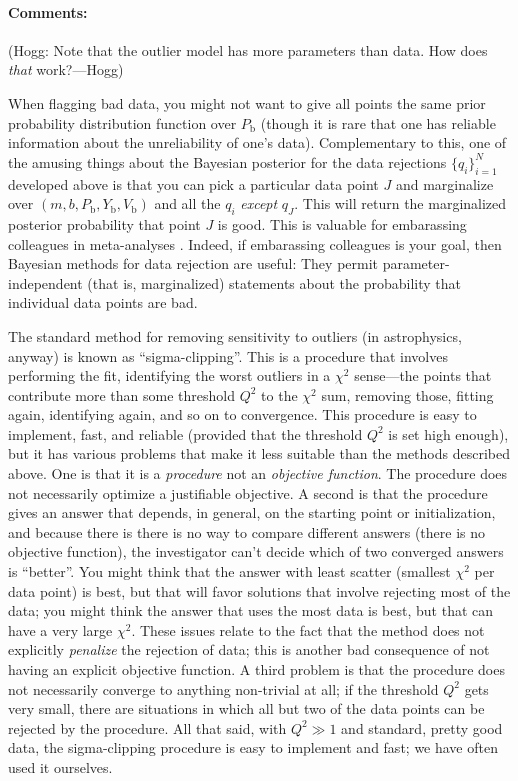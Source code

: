 \documentclass[12pt,twoside]{article}
\newcommand{\commentsname}{Comments}
\newcounter{problem}
\newenvironment{comments}{\paragraph{\commentsname:}}{}
\newcommand{\setofall}[3]{\{{#1}\}_{{#2}}^{{#3}}}
\newcommand{\allq}{\setofall{q_i}{i=1}{N}}
\newcommand{\Pbad}{P_{\mathrm{b}}}
\newcommand{\Ybad}{Y_{\mathrm{b}}}
\newcommand{\Vbad}{V_{\mathrm{b}}}
\begin{document}
\begin{comments}
(Hogg: Note that the outlier model has more parameters than data.  How
  does \emph{that} work?---Hogg)

When flagging bad data, you might not want to give all points the same
prior probability distribution function over $\Pbad$ (though it is
rare that one has reliable information about the unreliability of
one's data).  Complementary to this, one of the amusing things about
the Bayesian posterior for the data rejections $\allq$ developed above
is that you can pick a particular data point $J$ and marginalize over
$(m,b,\Pbad,\Ybad,\Vbad)$ and all the $q_i$ \emph{except} $q_J$.  This
will return the marginalized posterior probability that point $J$ is
good.  This is valuable for embarassing colleagues in meta-analyses
\citep{pressH0}.  Indeed, if embarassing colleagues is your goal, then
Bayesian methods for data rejection are useful:  They permit
parameter-independent (that is, marginalized) statements about the
probability that individual data points are bad.

The standard method for removing sensitivity to outliers (in
astrophysics, anyway) is known as ``sigma-clipping''.  This is a
procedure that involves performing the fit, identifying the worst
outliers in a $\chi^2$ sense---the points that contribute more than
some threshold $Q^2$ to the $\chi^2$ sum, removing those, fitting
again, identifying again, and so on to convergence.  This procedure is
easy to implement, fast, and reliable (provided that the threshold
$Q^2$ is set high enough), but it has various problems that make it
less suitable than the methods described above.  One is that it is a
\emph{procedure} not an \emph{objective function}.  The procedure does
not necessarily optimize a justifiable objective.  A second is that
the procedure gives an answer that depends, in general, on the
starting point or initialization, and because there is there is no way
to compare different answers (there is no objective function), the
investigator can't decide which of two converged answers is
``better''.  You might think that the answer with least scatter
(smallest $\chi^2$ per data point) is best, but that will favor
solutions that involve rejecting most of the data; you might think the
answer that uses the most data is best, but that can have a very
large $\chi^2$.  These issues relate to the fact that the method does
not explicitly \emph{penalize} the rejection of data; this is another
bad consequence of not having an explicit objective function.  A third
problem is that the procedure does not necessarily converge to
anything non-trivial at all; if the threshold $Q^2$ gets very small,
there are situations in which all but two of the data points can be
rejected by the procedure.  All that said, with $Q^2\gg 1$ and
standard, pretty good data, the sigma-clipping procedure is easy to
implement and fast; we have often used it ourselves.


\end{comments}
\end{document}
